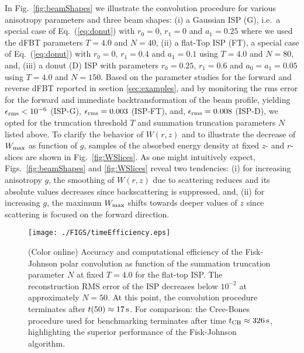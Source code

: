\documentclass[12pt]{iopart}
\begin{document}
In Fig.~\ref{fig:beamShapes} we illustrate the convolution
procedure for various anisotropy parameters and three beam shapes:
(i) a Gaussian ISP (G), i.e.\ a special case of Eq.~(\ref{eq:donut}) with
$r_0=0$, $r_1=0$ and $a_1=0.25$ where we used the dFBT parameters $T=4.0$ 
and $N=40$,
(ii) a flat-Top ISP (FT), a special 
case of Eq.~(\ref{eq:donut}) with $r_0=0$, $r_1=0.4$ and $a_1=0.1$ using 
$T=4.0$ and $N=80$,
and,
(iii) a donut (D) ISP with parameters $r_0=0.25$, $r_1=0.6$ and $a_0=a_1=0.05$ 
using $T=4.0$ and $N=150$.
Based on the parameter studies for the forward and reverse dFBT reported in
section \ref{sec:examples}, and by monitoring the rms error for the forward and
immediate backtransformation of the beam profile, yielding $\epsilon_{\rm
rms}<10^{-6}$ (ISP-G), $\epsilon_{\rm rms}=0.003$ (ISP-FT), and, $\epsilon_{\rm
rms}=0.008$ (ISP-D), we opted for the truncation threshold $T$ and summation
truncation parameters $N$ listed above. 
To clarify the behavior of $W(r,z)$ and to illustrate the decrease of $W_{\rm
max}$ as function of $g$, samples of the absorbed energy density at fixed $z$-
and $r$-slices are shown in Fig.~\ref{fig:WSlices}. As one might intuitively
expect, Figs.~\ref{fig:beamShapes} and \ref{fig:WSlices} reveal two tendencies:
(i) for increasing anisotropy $g$, the smoothing of $W(r,z)$ due to scattering
reduces and its absolute values decreases since backscattering is suppressed, 
and, (ii) for increasing $g$, the maximum $W_{\rm max}$ shifts towards deeper 
values of $z$ since scattering is focused on the forward direction.

%
%
\begin{figure}[t!]
\centerline{\texttt{[image: ./FIGS/timeEfficiency.eps]} } 
\caption{(Color online) Accuracy and computational efficiency of the Fisk-Johnson
polar convolution as function of the summation truncation parameter $N$ at
fixed $T=4.0$ for the flat-top ISP. The reconstruction RMS error of the ISP
decreases below $10^{-2}$ at approximately $N=50$. At this point, the 
convolution procedure terminates after $t(50)\approx 17\,{\rm{s}}$. For 
comparison: the Cree-Bones procedure used for benchmarking terminates after
time $t_{\rm{CB}}\approx 326\,{\rm{s}}$, highlighting the superior performance 
of the Fisk-Johnson algorithm.
}
\label{fig:timeEfficiency}
\end{figure}
\end{document}
